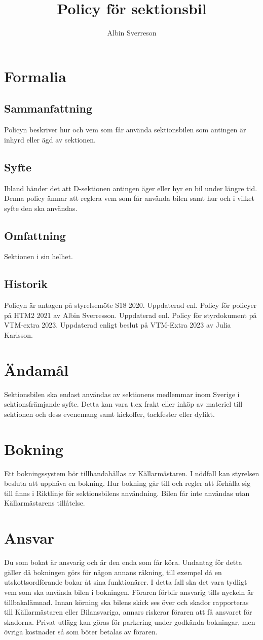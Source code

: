 \documentclass{dsekprotokoll}
\author{Albin Sverreson}
\title{Policy för sektionsbil}
\begin{document}
\maketitle
\section{Formalia}
\subsection{Sammanfattning}
Policyn beskriver hur och vem som får använda sektionsbilen som antingen är inhyrd eller ägd av sektionen.
\subsection{Syfte}
Ibland händer det att D-sektionen antingen äger eller hyr en bil under längre tid. Denna policy ämnar att reglera vem som får använda bilen samt hur och i vilket syfte den ska användas.
\subsection{Omfattning}
Sektionen i sin helhet.
\subsection{Historik}
Policyn är antagen på styrelsemöte S18 2020.
Uppdaterad enl. Policy för policyer på HTM2 2021 av Albin Sverresson.
Uppdaterad enl. Policy för styrdokument på VTM-extra 2023.
Uppdaterad enligt beslut på VTM-Extra 2023 av Julia Karlsson.


\section{Ändamål}
Sektionsbilen ska endast användas av sektionens medlemmar inom Sverige i sektionsfrämjande syfte. Detta kan vara t.ex frakt eller inköp av materiel till sektionen och dess evenemang samt kickoffer, tackfester eller dylikt.
\section{Bokning}
Ett bokningssystem bör tillhandahållas av Källarmästaren. I nödfall kan styrelsen besluta att upphäva en bokning. Hur bokning går till och regler att förhålla sig till finns i Riktlinje för sektionsbilens användning. Bilen får inte användas utan Källarmästarens tillåtelse.

\section{Ansvar}
Du som bokat är ansvarig och är den enda som får köra. Undantag för detta gäller då bokningen görs för någon annans räkning, till exempel då en utskottsordförande bokar åt sina funktionärer. I detta fall ska det vara tydligt vem som ska använda bilen i bokningen. Föraren förblir ansvarig tills nyckeln är tillbakalämnad. Innan körning ska bilens skick ses över och skador rapporteras till Källarmästaren eller
Bilansvariga, annars riskerar föraren att få ansvaret för skadorna. Privat utlägg kan göras för parkering under godkända
bokningar, men övriga kostnader så som böter betalas av föraren.
\end{document}
